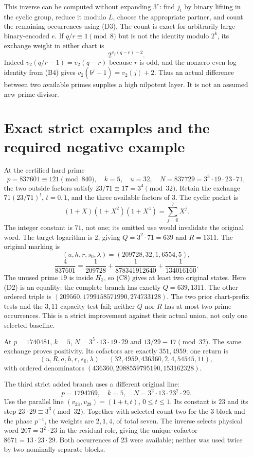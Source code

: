 This inverse can be computed without expanding $3^e$: find $j_t$ by binary
lifting in the cyclic group, reduce it modulo $L$, choose the appropriate
partner, and count the remaining occurrences using (D3). The count is exact
for arbitrarily large binary-encoded $e$. If $q/r\equiv1\pmod8$ but is not
the identity modulo $2^k$, its exchange weight in either chart is
\[
 \boxed{2^{v_2(q-r)-2}.}                                   \tag{D4}
\]
Indeed $v_2(q/r-1)=v_2(q-r)$ because $r$ is odd, and the nonzero even-log
identity from (B4) gives $v_2(b^j-1)=v_2(j)+2$.
Thus an actual difference between two available primes supplies a high
nilpotent layer. It is not an assumed new prime divisor.

\section{Exact strict examples and the required negative example}
At the certified hard prime
\[
 p=837601\equiv121\pmod{840},\quad k=5,\quad u=32,\quad
 N=837729=3^3\cdot19\cdot23\cdot71,                         \tag{E1}
\]
the two outside factors satisfy $23/71\equiv17=3^4\pmod{32}$.
Retain the exchange $71(23/71)^t$, $t=0,1$, and the three available factors
of $3$. The cyclic packet is
\[
 (1+X)(1+X^2)(1+X^4)=\sum_{j=0}^7X^j.                     \tag{E2}
\]
The integer constant is $71$, not one; its omitted use would invalidate
the original word. The target logarithm is $2$, giving $Q=3^2\cdot71=639$
and $R=1311$. The original marking is
\[
 (a,h,r,s_0,\lambda)=(209728,32,1,6554,5),
\]
\[
 \boxed{\frac4{837601}=\frac1{209728}+
       \frac1{878341912640}+\frac1{134016160}.}              \tag{E3}
\]
The unused prime $19$ is inside $H_3$, so (C8) gives at least two original
states. Here (D2) is an equality: the complete branch has exactly
$Q=639,1311$. The other ordered triple is
$(209560,1799158571990,274733128)$.
The two prior chart-prefix tests and the $3,11$ capacity test fail;
neither $Q$ nor $R$ has at most two prime occurrences. This is a strict
improvement against their actual union, not only one selected baseline.

At $p=1740481$, $k=5$,
$N=3^5\cdot13\cdot19\cdot29$ and $13/29\equiv17\pmod{32}$.
The same exchange proves positivity. Its cofactors are exactly $351,4959$;
one return is
\[
 (u,R,a,h,r,s_0,\lambda)=(32,4959,436360,2,4,54545,11),
\]
with ordered denominators $(436360,2088559795190,153162328)$.

The third strict added branch uses a different original line:
\[
 p=1794769,\quad k=5,\quad N=3^2\cdot13\cdot23^2\cdot29.
\]
Use the parallel line $(v_{23},v_{29})=(1+t,t)$, $0\le t\le1$.
Its constant is $23$ and its step $23\cdot29\equiv3^3\pmod{32}$.
Together with selected count two for the $3$ block and the phase $p^{-1}$,
the weights are $2,1,4$, of total seven. The inverse selects physical word
$207=3^2\cdot23$ in the residual role, giving the unique cofactor
$8671=13\cdot23\cdot29$. Both occurrences of $23$ were available; neither
was used twice by two nominally separate blocks.

